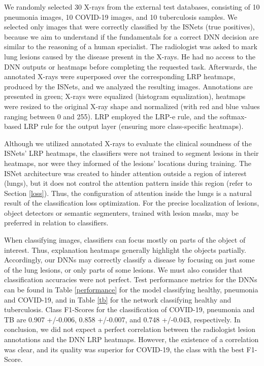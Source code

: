 \documentclass[fleqn,10pt]{wlscirep}
\begin{document}
{We randomly selected 30 X-rays from the external test databases, consisting of 10 pneumonia images, 10 COVID-19 images, and 10 tuberculosis samples. We selected only images that were correctly classified by the ISNets (true positives), because we aim to understand if the fundamentals for a correct DNN decision are similar to the reasoning of a human specialist. The radiologist was asked to mark lung lesions caused by the disease present in the X-rays. He had no access to the DNN outputs or heatmaps before completing the requested task. Afterwards, the annotated X-rays were superposed over the corresponding LRP heatmaps, produced by the ISNets, and we analyzed the resulting images. Annotations are presented in green; X-rays were equalized (histogram equalization), heatmaps were resized to the original X-ray shape and normalized (with red and blue values ranging between 0 and 255). LRP employed the LRP-e rule, and the softmax-based LRP rule\cite{LRPBook} for the output layer (ensuring more class-specific heatmaps).

Although we utilized annotated X-rays to evaluate the clinical soundness of the ISNets' LRP heatmaps, the classifiers were not trained to segment lesions in their heatmaps, nor were they informed of the lesions' locations during training. The ISNet architecture was created to hinder attention outside a region of interest (lungs), but it does not control the attention pattern inside this region (refer to Section \ref{loss}). Thus, the configuration of attention inside the lungs is a natural result of the classification loss optimization. For the precise localization of lesions, object detectors or semantic segmenters, trained with lesion masks, may be preferred in relation to classifiers.

When classifying images, classifiers can focus mostly on parts of the object of interest. Thus, explanation heatmaps generally highlight the objects partially\cite{SEC}. Accordingly, our DNNs may correctly classify a disease by focusing on just some of the lung lesions, or only parts of some lesions. We must also consider that classification accuracies were not perfect. Test performance metrics for the DNNs can be found in Table \ref{performance} for the model classifying healthy, pneumonia and COVID-19, and in Table \ref{tb} for the network classifying healthy and tuberculosis. Class F1-Scores for the classification of COVID-19, pneumonia and TB are 0.907 +/-0.006, 0.858 +/-0.007, and 0.748 +/-0.043, respectively. In conclusion, we did not expect a perfect correlation between the radiologist lesion annotations and the DNN LRP heatmaps. However, the existence of a correlation was clear, and its quality was superior for COVID-19, the class with the best F1-Score.

}
\end{document}
